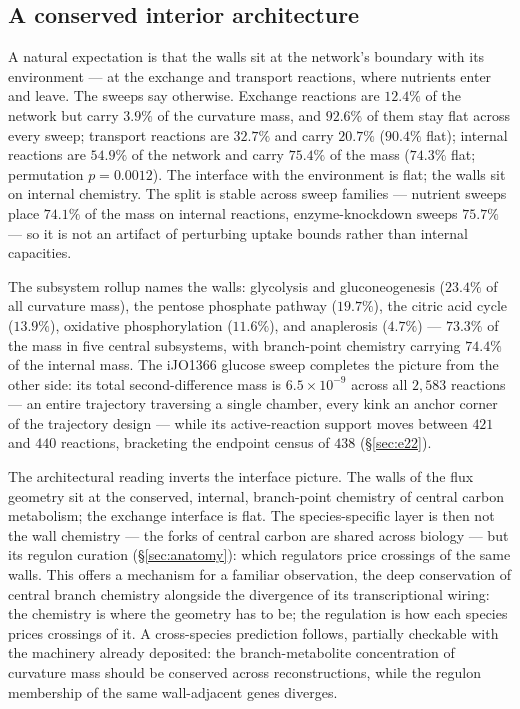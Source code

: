 \documentclass[11pt,a4paper]{article}
\theoremstyle{plain}
\theoremstyle{definition}
\theoremstyle{remark}
\begin{document}
\subsection{A conserved interior architecture}\label{sec:interior}

A natural expectation is that the walls sit at the network's
boundary with its environment --- at the exchange and transport
reactions, where nutrients enter and leave. The sweeps say
otherwise. Exchange reactions are $12.4\%$ of the network but
carry $3.9\%$ of the curvature mass, and $92.6\%$ of them stay
flat across every sweep; transport reactions are $32.7\%$ and
carry $20.7\%$ ($90.4\%$ flat); internal reactions are $54.9\%$ of
the network and carry $75.4\%$ of the mass ($74.3\%$ flat;
permutation $p = 0.0012$). The interface with the environment is
flat; the walls sit on internal chemistry. The split is stable
across sweep families --- nutrient sweeps place $74.1\%$ of the
mass on internal reactions, enzyme-knockdown sweeps $75.7\%$ --- so
it is not an artifact of perturbing uptake bounds rather than
internal capacities.

The subsystem rollup names the walls: glycolysis and
gluconeogenesis ($23.4\%$ of all curvature mass), the pentose
phosphate pathway ($19.7\%$), the citric acid cycle ($13.9\%$),
oxidative phosphorylation ($11.6\%$), and anaplerosis ($4.7\%$)
--- $73.3\%$ of the mass in five central subsystems, with
branch-point chemistry carrying $74.4\%$ of the internal mass.
The iJO1366 glucose sweep completes the picture from the other
side: its total second-difference mass is $6.5 \times 10^{-9}$
across all $2{,}583$ reactions --- an entire trajectory traversing
a single chamber, every kink an anchor corner of the trajectory
design --- while its active-reaction support moves between $421$
and $440$ reactions, bracketing the endpoint census of $438$
(\S\ref{sec:e22}).

The architectural reading inverts the interface picture. The walls
of the flux geometry sit at the conserved, internal, branch-point
chemistry of central carbon metabolism; the exchange interface is
flat. The species-specific layer is then not the wall chemistry
--- the forks of central carbon are shared across biology --- but
its regulon curation (\S\ref{sec:anatomy}): which regulators price
crossings of the same walls. This offers a mechanism for a
familiar observation, the deep conservation of central branch
chemistry alongside the divergence of its transcriptional wiring:
the chemistry is where the geometry has to be; the regulation is
how each species prices crossings of it. A cross-species
prediction follows, partially checkable with the machinery
already deposited: the branch-metabolite concentration of
curvature mass should be conserved across reconstructions, while
the regulon membership of the same wall-adjacent genes diverges.
\end{document}
